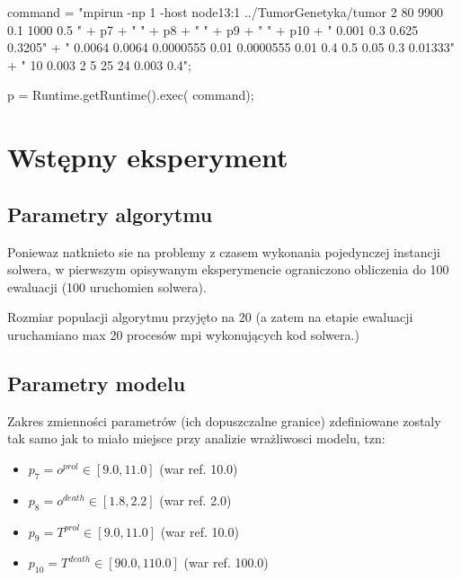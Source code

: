 \documentclass[]{article}
\newenvironment{Shaded}{}{}
\newcommand{\StringTok}[1]{\textcolor[rgb]{0.25,0.44,0.63}{{#1}}}
\newcommand{\FunctionTok}[1]{\textcolor[rgb]{0.02,0.16,0.49}{{#1}}}
\newcommand{\NormalTok}[1]{{#1}}
\providecommand{\tightlist}{%
  \setlength{\itemsep}{0pt}\setlength{\parskip}{0pt}}
\begin{document}
\begin{Shaded}
\begin{Highlighting}[]
            \NormalTok{command = }\StringTok{"mpirun -np 1 -host node13:1 ../TumorGenetyka/tumor 2 80 9900 0.1 1000 0.5 "}
                    \NormalTok{+ p7 + }\StringTok{" "} \NormalTok{+ p8 + }\StringTok{" "} \NormalTok{+ p9 + }\StringTok{" "} \NormalTok{+ p10}
                    \NormalTok{+ }\StringTok{" 0.001 0.3 0.625 0.3205"}
                    \NormalTok{+ }\StringTok{" 0.0064 0.0064 0.0000555 0.01 0.0000555 0.01 0.4 0.5 0.05 0.3 0.01333"}
                    \NormalTok{+ }\StringTok{" 10 0.003 2 5 25 24 0.003 0.4"}\NormalTok{;}

            \NormalTok{p = Runtime.}\FunctionTok{getRuntime}\NormalTok{().}\FunctionTok{exec}\NormalTok{(}
                    \NormalTok{command);}
\end{Highlighting}
\end{Shaded}

\section{Wstępny eksperyment}\label{wstux119pny-eksperyment}

\subsection{Parametry algorytmu}\label{parametry-algorytmu}

Poniewaz natknieto sie na problemy z czasem wykonania pojedynczej
instancji solwera, w pierwszym opisywanym eksperymencie ograniczono
obliczenia do 100 ewaluacji (100 uruchomien solwera).

Rozmiar populacji algorytmu przyjęto na 20 (a zatem na etapie ewaluacji
uruchamiano max 20 procesów mpi wykonujących kod solwera.)

\subsection{Parametry modelu}\label{parametry-modelu}

Zakres zmienności parametrów (ich dopuszczalne granice) zdefiniowane
zostaly tak samo jak to miało miejsce przy analizie wrażliwosci modelu,
tzn:

\begin{itemize}
\tightlist
\item
  \(p_7=o^{prol} \in [9.0,11.0]\) (war ref. 10.0)
\item
  \(p_8=o^{death} \in [1.8,2.2]\) (war ref. 2.0)
\item
  \(p_9=T^{prol} \in [9.0,11.0]\) (war ref. 10.0)
\item
  \(p_{10}=T^{death} \in [90.0,110.0]\) (war ref. 100.0)
\end{itemize}
\end{document}
